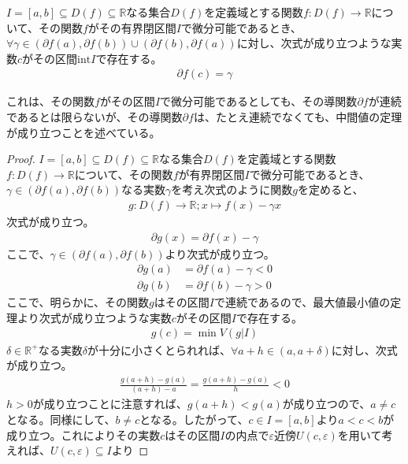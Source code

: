 \documentclass[dvipdfmx]{jsarticle}
\begin{document}
\begin{thm}\label{4.2.2.10}
$I = [ a,b] \subseteq D(f) \subseteq \mathbb{R}$なる集合$D(f)$を定義域とする関数$f:D(f) \rightarrow \mathbb{R}$について、その関数$f$がその有界閉区間$I$で微分可能であるとき、$\forall\gamma \in \left( \partial f(a),\partial f(b) \right) \cup \left( \partial f(b),\partial f(a) \right)$に対し、次式が成り立つような実数$c$がその区間$\mathrm{int}I$で存在する。
\begin{align*}
\partial f(c) = \gamma
\end{align*}
\end{thm}\par
これは、その関数$f$がその区間$I$で微分可能であるとしても、その導関数$\partial f$が連続であるとは限らないが、その導関数$\partial f$は、たとえ連続でなくても、中間値の定理が成り立つことを述べている。
\begin{proof}
$I = [ a,b] \subseteq D(f) \subseteq \mathbb{R}$なる集合$D(f)$を定義域とする関数$f:D(f) \rightarrow \mathbb{R}$について、その関数$f$が有界閉区間$I$で微分可能であるとき、$\gamma \in \left( \partial f(a),\partial f(b) \right)$なる実数$\gamma$を考え次式のように関数$g$を定めると、
\begin{align*}
g:D(f) \rightarrow \mathbb{R};x \mapsto f(x) - \gamma x
\end{align*}
次式が成り立つ。
\begin{align*}
\partial g(x) = \partial f(x) - \gamma
\end{align*}
ここで、$\gamma \in \left( \partial f(a),\partial f(b) \right)$より次式が成り立つ。
\begin{align*}
\partial g(a) &= \partial f(a) - \gamma < 0\\
\partial g(b) &= \partial f(b) - \gamma > 0
\end{align*}
ここで、明らかに、その関数$g$はその区間$I$で連続であるので、最大値最小値の定理より次式が成り立つような実数$c$がその区間$I$で存在する。
\begin{align*}
g(c) = \min{V\left( g|I \right)}
\end{align*}
$\delta \in \mathbb{R}^{+}$なる実数$\delta$が十分に小さくとられれば、$\forall a + h \in (a,a + \delta)$に対し、次式が成り立つ。
\begin{align*}
\frac{g(a + h) - g(a)}{(a + h) - a} = \frac{g(a + h) - g(a)}{h} < 0
\end{align*}
$h > 0$が成り立つことに注意すれば、$g(a + h) < g(a)$が成り立つので、$a \neq c$となる。同様にして、$b \neq c$となる。したがって、$c \in I = [ a,b]$より$a < c < b$が成り立つ。これによりその実数$c$はその区間$I$の内点で$\varepsilon$近傍$U(c,\varepsilon)$を用いて考えれば、$U(c,\varepsilon) \subseteq I$より

\end{proof}
\end{document}
